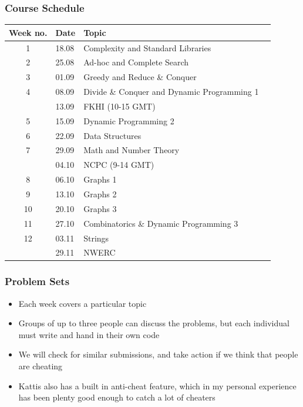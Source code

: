 \documentclass{beamer}
\begin{document}
\begin{frame}[plain]
	\frametitle{Course Schedule}
	\scriptsize
    \begin{center}
        \begin{tabular}{cl|ll}
            Week no. & Date & Topic \\ \hline
            1 & 18.08 & Complexity and Standard Libraries \\
            2 & 25.08 & Ad-hoc and Complete Search \\
            3 & 01.09 & Greedy and Reduce \& Conquer \\
            4 & 08.09 & Divide \& Conquer and Dynamic Programming 1 \\
            & 13.09 & FKHI (10-15 GMT) \\
            5 & 15.09 & Dynamic Programming 2 \\
            6 & 22.09 & Data Structures \\
            7 & 29.09 & Math and Number Theory \\
            & 04.10 & NCPC (9-14 GMT) \\
            8 & 06.10 & Graphs 1 \\
            9 & 13.10 & Graphs 2 \\
            10 & 20.10 & Graphs 3 \\
            11 & 27.10 & Combinatorics \& Dynamic Programming 3 \\
            12 & 03.11 & Strings \\
             & 29.11 & NWERC \\
        \end{tabular}
    \end{center}
\end{frame}

\begin{frame}[plain]
	\frametitle{Problem Sets}
	\begin{itemize}
		\item Each week covers a particular topic
        \item Groups of up to three people can discuss the problems, but each individual must write and hand in their own code
        \item We will check for similar submissions, and take action if we think that people are cheating
        \item Kattis also has a built in anti-cheat feature, which in my personal experience has been plenty good enough to catch a lot of cheaters
	\end{itemize}
\end{frame}
\end{document}
